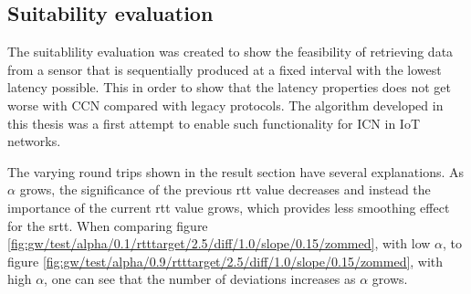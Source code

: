 \subsection{Suitability evaluation}
The suitablility evaluation was created to show the feasibility of retrieving data from a sensor that is sequentially produced at a fixed interval with the lowest latency possible. This in order to show that the latency properties does not get worse with CCN compared with legacy protocols. The algorithm developed in this thesis was a first attempt to enable such functionality for ICN in IoT networks.





The varying round trips shown in the result section have several explanations. As $\alpha$ grows, the significance of the previous rtt value decreases and instead the importance of the current rtt value grows, which provides less smoothing effect for the srtt.
When comparing figure \ref{fig:gw/test/alpha/0.1/rtttarget/2.5/diff/1.0/slope/0.15/zommed}, with low $\alpha$, to figure \ref{fig:gw/test/alpha/0.9/rtttarget/2.5/diff/1.0/slope/0.15/zommed}, with high $\alpha$, one can see that the number of deviations increases as $\alpha$ grows.

